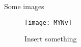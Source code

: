 

\title{}
\author{}
\date{01 May 2022}

\maketitle
Some images
\begin{figure}
\texttt{[image: MYNv]}
\caption{Insert something}
\label{fig: smth}
\end{figure}
